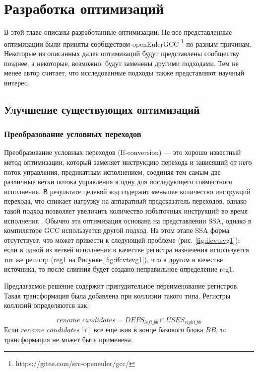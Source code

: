 \chapter{Разработка оптимизаций}\label{ch:ch2}

В этой главе описаны разработанные оптимизации. Не все представленные оптимизации были приняты сообществом openEulerGCC \footnote{https://gitee.com/src-openeuler/gcc/} по разным причинам. Некоторые из описанных далее оптимизаций будут представлены сообществу позднее, а некоторые, возможно, будут заменены другими подходами. Тем не менее автор считает, что исследованные подходы также представляют научный интерес.


\section{Улучшение существующих оптимизаций}\label{sec:ch2/sect1}
\subsection{Преобразование условных переходов} \label{opt:ifconv}
Преобразование условных переходов (If-conversion) — это хорошо известный метод оптимизации, который заменяет инструкцию перехода и зависящий от него поток управления, предикатным исполнением, соединяя тем самым две различные ветки потока управления в одну для последующего совместного исполнения.  В результате целевой код содержит меньшее количество инструкций перехода, что снижает нагрузку на аппаратный предсказатель переходов, однако такой подход позволяет увеличить количество избыточных инструкций во время исполнения \cite{bruel2021if}. Обычно эта оптимизация основана на представлении SSA, однако в компиляторе GCC используется другой подход. На этом этапе SSA форма отсутствует, что может привести к следующей проблеме (рис. \ref{fig:ifcvtsvg1}): если в одной из ветвей исполнения в качестве регистра назначения используется  тот же регистр (reg1 на
Рисунке \ref{fig:ifcvtsvg1}), что в другом в качестве источника, то после слияния будет создано неправильное определение reg1.

Предлагаемое решение содержит принудительное переименование регистров. Такая трансформация была добавлена при коллизии такого типа. Регистры коллизий определяются как:

$$rename\_candidates = DEFS_{left\_bb} \cap USES_{right\_bb} $$
Если $rename\_candidates[i]$ все еще жив в конце базового блока $BB$, то трансформация не может быть применена.


